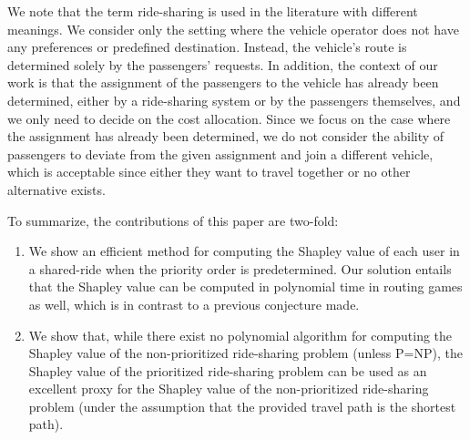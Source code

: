 \documentclass[sigconf]{aamas}
\begin{document}

We note that the term ride-sharing is used in the literature with different meanings. We consider only the setting where the vehicle operator does not have any preferences or predefined destination. Instead, the vehicle's route is determined solely by the passengers' requests.
In addition, the context of our work is that the assignment of the passengers to the vehicle has already been determined, either by a ride-sharing system or by the passengers themselves, and we only need to decide on the cost allocation. %
Since we focus on the case where the assignment has already been determined, we do not consider the ability of passengers to deviate from the given assignment and join a different vehicle, which is acceptable since either they want to travel together or no other alternative exists. %



To summarize, the contributions of this paper are two-fold:
\begin{enumerate}%
    \item We show an efficient method for computing the Shapley value of each user in a shared-ride when the priority order is predetermined. %
Our solution entails that the Shapley value can be computed in polynomial time in routing games as well, which is in contrast to a previous conjecture made.
\item We show that, while there exist no polynomial algorithm for computing the Shapley value of the non-prioritized ride-sharing problem (unless P=NP), the Shapley value of the prioritized ride-sharing problem can be used as an excellent proxy for the Shapley value of the non-prioritized ride-sharing problem (under the assumption that the provided travel path is the shortest path).
\end{enumerate}
\end{document}
